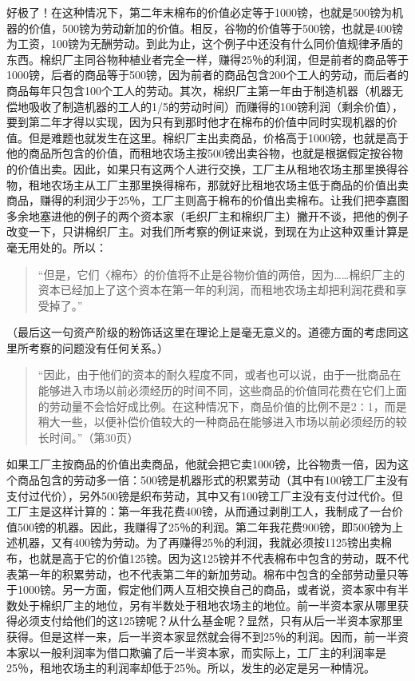 好极了！在这种情况下，第二年末棉布的价值必定等于1000镑，也就是500镑为机器的价值，500镑为劳动新加的价值。相反，谷物的价值等于500镑，也就是400镑为工资，100镑为无酬劳动。到此为止，这个例子中还没有什么同价值规律矛盾的东西。棉织厂主同谷物种植业者完全一样，赚得25％的利润，但是前者的商品等于1000镑，后者的商品等于500镑，因为前者的商品包含200个工人的劳动，而后者的商品每年只包含100个工人的劳动。其次，棉织厂主第一年由于制造机器（机器无偿地吸收了制造机器的工人的1/5的劳动时间）而赚得的100镑利润（剩余价值），要到第二年才得以实现，因为只有到那时他才在棉布的价值中同时实现机器的价值。但是难题也就发生在这里。棉织厂主出卖商品，价格高于1000镑，也就是高于他的商品所包含的价值，而租地农场主按500镑出卖谷物，也就是根据假定按谷物的价值出卖。因此，如果只有这两个人进行交换，工厂主从租地农场主那里换得谷物，租地农场主从工厂主那里换得棉布，那就好比租地农场主低于商品的价值出卖商品，赚得的利润少于25％，工厂主则高于棉布的价值出卖棉布。让我们把李嘉图多余地塞进他的例子的两个资本家（毛织厂主和棉织厂主）撇开不谈，把他的例子改变一下，只讲棉织厂主。对我们所考察的例证来说，到现在为止这种双重计算是毫无用处的。所以：

\begin{quote}{“但是，它们〈棉布〉的价值将不止是谷物价值的两倍，因为……棉织厂主的资本已经加上了这个资本在第一年的利润，而租地农场主却把利润花费和享受掉了。”}\end{quote}

（最后这一句资产阶级的粉饰话这里在理论上是毫无意义的。道德方面的考虑同这里所考察的问题没有任何关系。）

\begin{quote}{“因此，由于他们的资本的耐久程度不同，或者也可以说，由于一批商品在能够进入市场以前必须经历的时间不同，这些商品的价值同花费在它们上面的劳动量不会恰好成比例。在这种情况下，商品价值的比例不是2∶1，而是稍大一些，以便补偿价值较大的一种商品在能够进入市场以前必须经历的较长时间。”（第30页）}\end{quote}

如果工厂主按商品的价值出卖商品，他就会把它卖1000镑，比谷物贵一倍，因为这个商品包含的劳动多一倍：500镑是机器形式的积累劳动（其中有100镑工厂主没有支付过代价），另外500镑是织布劳动，其中又有100镑工厂主没有支付过代价。但工厂主是这样计算的：第一年我花费400镑，从而通过剥削工人，我制成了一台价值500镑的机器。因此，我赚得了25％的利润。第二年我花费900镑，即500镑为上述机器，又有400镑为劳动。为了再赚得25％的利润，我就必须按1125镑出卖棉布，也就是高于它的价值125镑。因为这125镑并不代表棉布中包含的劳动，既不代表第一年的积累劳动，也不代表第二年的新加劳动。棉布中包含的全部劳动量只等于1000镑。另一方面，假定他们两人互相交换自己的商品，或者说，资本家中有半数处于棉织厂主的地位，另有半数处于租地农场主的地位。前一半资本家从哪里获得必须支付给他们的这125镑呢？从什么基金呢？显然，只有从后一半资本家那里获得。但是这样一来，后一半资本家显然就会得不到25％的利润。因而，前一半资本家以一般利润率为借口欺骗了后一半资本家，而实际上，工厂主的利润率是25％，租地农场主的利润率却低于25％。所以，发生的必定是另一种情况。

